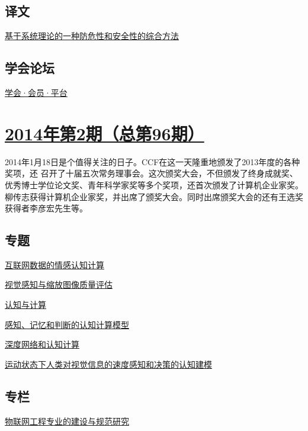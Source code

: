\documentclass[a4paper]{article}
\begin{document}
\subsection{译文}
\href{http://history.ccf.org.cn/resources/1190201776262/2014/03/11/14.pdf}{基于系统理论的一种防危性和安全性的综合方法}

\subsection{学会论坛}
\href{http://history.ccf.org.cn/resources/1190201776262/2014/03/11/15.pdf}{学会·会员·平台}


\section{\href{http://history.ccf.org.cn/sites/ccf/jsjtbbd.jsp?contentId=2785161647298}{\textbf{2014年第2期（总第96期）}}}
2014年1月18日是个值得关注的日子。CCF在这一天隆重地颁发了2013年度的各种奖项，还
召开了十届五次常务理事会。这次颁奖大会，不但颁发了终身成就奖、优秀博士学位论文奖、青年科学家奖等多个奖项，还首次颁发了计算机企业家奖。柳传志获得计算机企业家奖，并出席了颁奖大会。同时出席颁奖大会的还有王选奖获得者李彦宏先生等。
\subsection{专题}
\href{http://history.ccf.org.cn/resources/1190201776262/2014/02/17/5.pdf}{互联网数据的情感认知计算}

\href{http://history.ccf.org.cn/resources/1190201776262/2014/02/17/6.pdf}{视觉感知与缩放图像质量评估}

\href{http://history.ccf.org.cn/resources/1190201776262/2014/02/17/01.pdf}{认知与计算}

\href{http://history.ccf.org.cn/resources/1190201776262/2014/02/17/2.pdf}{感知、记忆和判断的认知计算模型}

\href{http://history.ccf.org.cn/resources/1190201776262/2014/02/17/3.pdf}{深度网络和认知计算}

\href{http://history.ccf.org.cn/resources/1190201776262/2014/02/17/4.pdf}{运动状态下人类对视觉信息的速度感知和决策的认知建模}

\subsection{专栏}
\href{http://history.ccf.org.cn/resources/1190201776262/2014/02/17/8.pdf}{物联网工程专业的建设与规范研究}
\end{document}
